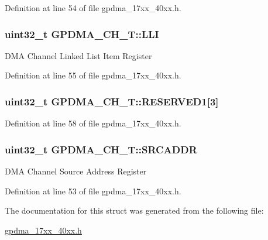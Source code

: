 Definition at line 54 of file gpdma\+\_\+17xx\+\_\+40xx.\+h.

\subsubsection[{\texorpdfstring{L\+LI}{LLI}}]{ uint32\+\_\+t G\+P\+D\+M\+A\+\_\+\+C\+H\+\_\+\+T\+::\+L\+LI}\hypertarget{structGPDMA__CH__T_a240936dbac9f3a949572b3dd196bd83f}{}\label{structGPDMA__CH__T_a240936dbac9f3a949572b3dd196bd83f}
D\+MA Channel Linked List Item Register 

Definition at line 55 of file gpdma\+\_\+17xx\+\_\+40xx.\+h.

\subsubsection[{\texorpdfstring{R\+E\+S\+E\+R\+V\+E\+D1}{RESERVED1}}]{ uint32\+\_\+t G\+P\+D\+M\+A\+\_\+\+C\+H\+\_\+\+T\+::\+R\+E\+S\+E\+R\+V\+E\+D1\mbox{[}3\mbox{]}}\hypertarget{structGPDMA__CH__T_ae6a0ee831032674d792f9da150e3025e}{}\label{structGPDMA__CH__T_ae6a0ee831032674d792f9da150e3025e}


Definition at line 58 of file gpdma\+\_\+17xx\+\_\+40xx.\+h.

\subsubsection[{\texorpdfstring{S\+R\+C\+A\+D\+DR}{SRCADDR}}]{ uint32\+\_\+t G\+P\+D\+M\+A\+\_\+\+C\+H\+\_\+\+T\+::\+S\+R\+C\+A\+D\+DR}\hypertarget{structGPDMA__CH__T_a734e1803144cdaa3cfab1507fa4f05d9}{}\label{structGPDMA__CH__T_a734e1803144cdaa3cfab1507fa4f05d9}
D\+MA Channel Source Address Register 

Definition at line 53 of file gpdma\+\_\+17xx\+\_\+40xx.\+h.



The documentation for this struct was generated from the following file\+:\begin{DoxyCompactItemize}
\item 
\hyperlink{gpdma__17xx__40xx_8h}{gpdma\+\_\+17xx\+\_\+40xx.\+h}\end{DoxyCompactItemize}
